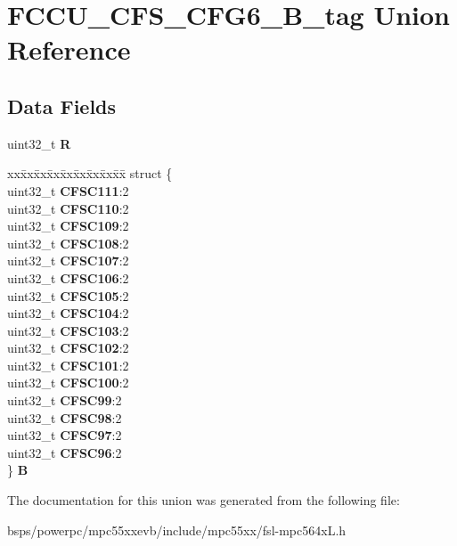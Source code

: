 \hypertarget{unionFCCU__CFS__CFG6__32B__tag}{}\section{F\+C\+C\+U\+\_\+\+C\+F\+S\+\_\+\+C\+F\+G6\+\_\+B\+\_\+tag Union Reference}
\label{unionFCCU__CFS__CFG6__32B__tag}
\subsection*{Data Fields}
\begin{DoxyCompactItemize}
\item 
\mbox{\label{unionFCCU__CFS__CFG6__32B__tag_accf22d8f86aa73cf45f6157690f0e4ac}} 
uint32\+\_\+t {\bfseries R}
\item 
\mbox{\label{unionFCCU__CFS__CFG6__32B__tag_ad8dc142565dba5af3e28dc7cf7d0c43d}} 
\begin{tabbing}
xx\=xx\=xx\=xx\=xx\=xx\=xx\=xx\=xx\=\kill
struct \{\\
\>uint32\_t {\bfseries CFSC111}:2\\
\>uint32\_t {\bfseries CFSC110}:2\\
\>uint32\_t {\bfseries CFSC109}:2\\
\>uint32\_t {\bfseries CFSC108}:2\\
\>uint32\_t {\bfseries CFSC107}:2\\
\>uint32\_t {\bfseries CFSC106}:2\\
\>uint32\_t {\bfseries CFSC105}:2\\
\>uint32\_t {\bfseries CFSC104}:2\\
\>uint32\_t {\bfseries CFSC103}:2\\
\>uint32\_t {\bfseries CFSC102}:2\\
\>uint32\_t {\bfseries CFSC101}:2\\
\>uint32\_t {\bfseries CFSC100}:2\\
\>uint32\_t {\bfseries CFSC99}:2\\
\>uint32\_t {\bfseries CFSC98}:2\\
\>uint32\_t {\bfseries CFSC97}:2\\
\>uint32\_t {\bfseries CFSC96}:2\\
\} {\bfseries B}\\

\end{tabbing}\end{DoxyCompactItemize}


The documentation for this union was generated from the following file\+:\begin{DoxyCompactItemize}
\item 
bsps/powerpc/mpc55xxevb/include/mpc55xx/fsl-\/mpc564x\+L.\+h\end{DoxyCompactItemize}
